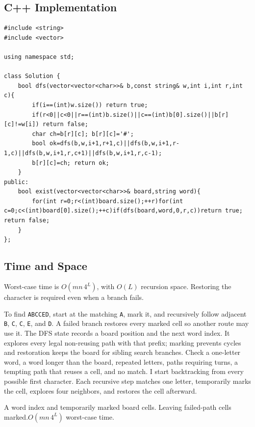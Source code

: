 \subsection{C++ Implementation}
\begin{lstlisting}[style=compactcode,caption={Complete C++ solution: Word Search}]
#include <string>
#include <vector>

using namespace std;

class Solution {
    bool dfs(vector<vector<char>>& b,const string& w,int i,int r,int c){
        if(i==(int)w.size()) return true;
        if(r<0||c<0||r==(int)b.size()||c==(int)b[0].size()||b[r][c]!=w[i]) return false;
        char ch=b[r][c]; b[r][c]='#';
        bool ok=dfs(b,w,i+1,r+1,c)||dfs(b,w,i+1,r-1,c)||dfs(b,w,i+1,r,c+1)||dfs(b,w,i+1,r,c-1);
        b[r][c]=ch; return ok;
    }
public:
    bool exist(vector<vector<char>>& board,string word){
        for(int r=0;r<(int)board.size();++r)for(int c=0;c<(int)board[0].size();++c)if(dfs(board,word,0,r,c))return true; return false;
    }
};
\end{lstlisting}

\subsection{Time and Space}
Worst-case time is \(O(mn\,4^L)\), with \(O(L)\) recursion space. Restoring
the character is required even when a branch fails.

\lessonexpansion
  {To find \texttt{ABCCED}, start at the matching \texttt{A}, mark it, and
   recursively follow adjacent \texttt{B}, \texttt{C}, \texttt{C},
   \texttt{E}, and \texttt{D}. A failed branch restores every marked cell so
   another route may use it.}
  {The DFS state records a board position and the next word index. It explores
   every legal non-reusing path with that prefix; marking prevents cycles and
   restoration keeps the board for sibling search branches.}
  {Check a one-letter word, a word longer than the board, repeated letters,
   paths requiring turns, a tempting path that reuses a cell, and no match.}
  {I start backtracking from every possible first character. Each recursive
   step matches one letter, temporarily marks the cell, explores four
   neighbors, and restores the cell afterward.}

  {A word index and temporarily marked board cells.}
  {Leaving failed-path cells marked.}{$O(mn\,4^L)$ worst-case time.}


